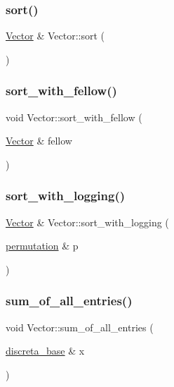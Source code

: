 \subsubsection{\texorpdfstring{sort()}{sort()}}
{\footnotesize\ttfamily \mbox{\hyperlink{class_vector}{Vector}} \& Vector\+::sort (\begin{DoxyParamCaption}{ }\end{DoxyParamCaption})}

\mbox{\label{class_vector_a689bf0a0797099e26f9b40d07cfd1b9c}} 
\subsubsection{\texorpdfstring{sort\+\_\+with\+\_\+fellow()}{sort\_with\_fellow()}}
{\footnotesize\ttfamily void Vector\+::sort\+\_\+with\+\_\+fellow (\begin{DoxyParamCaption}\item[{\mbox{\hyperlink{class_vector}{Vector}} \&}]{fellow }\end{DoxyParamCaption})}

\mbox{\label{class_vector_a5bcaeb8778ea91df5f29f9f3eb9913d4}} 
\subsubsection{\texorpdfstring{sort\+\_\+with\+\_\+logging()}{sort\_with\_logging()}}
{\footnotesize\ttfamily \mbox{\hyperlink{class_vector}{Vector}} \& Vector\+::sort\+\_\+with\+\_\+logging (\begin{DoxyParamCaption}\item[{\mbox{\hyperlink{classpermutation}{permutation}} \&}]{p }\end{DoxyParamCaption})}

\mbox{\label{class_vector_a82d3a4637450aa25030d4fd9bfff0642}} 
\subsubsection{\texorpdfstring{sum\+\_\+of\+\_\+all\+\_\+entries()}{sum\_of\_all\_entries()}}
{\footnotesize\ttfamily void Vector\+::sum\+\_\+of\+\_\+all\+\_\+entries (\begin{DoxyParamCaption}\item[{\mbox{\hyperlink{classdiscreta__base}{discreta\+\_\+base}} \&}]{x }\end{DoxyParamCaption})}


